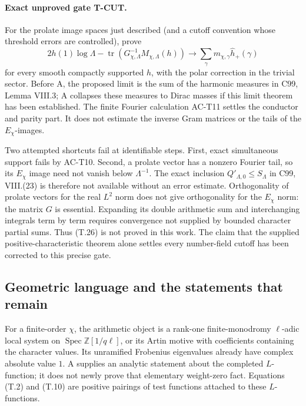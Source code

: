 \paragraph{Exact unproved gate T-CUT.}
For the prolate image spaces just described
(and a cutoff convention whose threshold errors
are controlled), prove
\[
 2h(1)\log\Lambda
 -\operatorname{tr}(G_{\chi,\Lambda}^{-1}M_{\chi,\Lambda}(h))
 \longrightarrow
 \sum_\gamma m_{\chi,\gamma}\widehat h_+(\gamma)               \tag{T.26}
\]
for every smooth compactly supported \(h\),
with the polar correction in the trivial
sector. Before A, the proposed limit is the
sum of the harmonic measures in C99,
Lemma VIII.3; A collapses these measures to
Dirac masses if this limit theorem has been
established. The finite Fourier calculation
AC-T11 settles the conductor and parity
part. It does not estimate the inverse Gram
matrices or the tails of the \(E_\chi\)-images.

Two attempted shortcuts fail at identifiable
steps. First, exact simultaneous support
fails by AC-T10. Second, a prolate vector
has a nonzero Fourier tail, so its \(E_\chi\)
image need not vanish below \(\Lambda^{-1}\).
The exact inclusion \(Q'_{\Lambda,0}\leq
S_\Lambda\) in C99, VIII.(23) is therefore
not available without an error estimate.
Orthogonality of prolate vectors for the
real \(L^2\) norm does not give orthogonality
for the \(E_\chi\) norm: the matrix \(G\)
is essential. Expanding its double arithmetic
sum and interchanging integrals term by
term requires convergence not supplied by
bounded character partial sums. Thus
(T.26) is not proved in this work. The
claim that the supplied positive-characteristic
theorem alone settles every number-field
cutoff has been corrected to this precise gate.

\subsection{Geometric language and the statements that remain}

For a finite-order \(\chi\), the arithmetic
object is a rank-one finite-monodromy
\(\ell\)-adic local system on
\(\operatorname{Spec}\mathbb Z[1/q\ell]\),
or its Artin motive with coefficients
containing the character values. Its
unramified Frobenius eigenvalues already
have complex absolute value \(1\).
A supplies an analytic statement about the
completed \(L\)-function; it does not newly
prove that elementary weight-zero fact.
Equations (T.2) and (T.10) are positive
pairings of test functions attached to
these \(L\)-functions.

